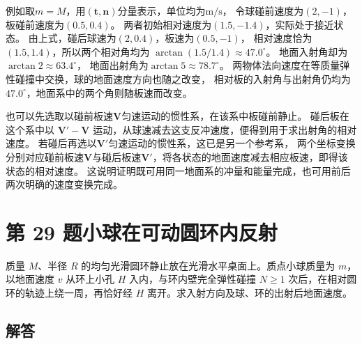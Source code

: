 \documentclass[UTF8,fontset=fandol,a4paper,11pt]{ctexart}
\newcommand{\vect}[1]{\bm{#1}}
\newcommand{\tagline}[1]{\noindent{\small\color{muted}#1}\par}
\newcommand{\figcaption}[1]{\par\vspace{2pt}{\small\color{muted}#1}\par}
\begin{document}
例如取$m=M$，用$(\vect t,\vect n)$分量表示，单位均为$\mathrm{m/s}$，
令球碰前速度为$(2,-1)$，板碰前速度为$(0.5,0.4)$。
两者初始相对速度为$(1.5,-1.4)$，实际处于接近状态。
由上式，碰后球速为$(2,0.4)$，板速为$(0.5,-1)$，
相对速度恰为$(1.5,1.4)$，所以两个相对角均为
$\arctan(1.5/1.4)\approx47.0^\circ$。
地面入射角却为$\arctan2\approx63.4^\circ$，
地面出射角为$\arctan5\approx78.7^\circ$。
两物体法向速度在等质量弹性碰撞中交换，球的地面速度方向也随之改变，
相对板的入射角与出射角仍均为$47.0^\circ$，地面系中的两个角则随板速而改变。

也可以先选取以碰前板速$\vect V$匀速运动的惯性系，在该系中板碰前静止。
碰后板在这个系中以 $\vect V'-\vect V$ 运动，从球速减去这支反冲速度，便得到用于求出射角的相对速度。
若碰后再选以$\vect V'$匀速运动的惯性系，这已是另一个参考系，
两个坐标变换分别对应碰前板速$\vect V$与碰后板速$\vect V'$，将各状态的地面速度减去相应板速，即得该状态的相对速度。
这说明证明既可用同一地面系的冲量和能量完成，也可用前后两次明确的速度变换完成。




\section*{第 29 题\quad 小球在可动圆环内反射}

\tagline{M-03-29}

质量 $M$、半径 $R$ 的均匀光滑圆环静止放在光滑水平桌面上。质点小球质量为 $m$，以地面速度 $v$ 从环上小孔 $H$ 入内，与环内壁完全弹性碰撞 $N\geq1$ 次后，在相对圆环的轨迹上绕一周，再恰好经 $H$ 离开。求入射方向及球、环的出射后地面速度。

\begin{center}\begin{minipage}{\linewidth}\centering{}
\figcaption{图 3.29\quad 入射角 $\theta$ 从 $H\to O$ 的内法线量起。}
\end{minipage}\end{center}

\subsection*{解答}
\end{document}
